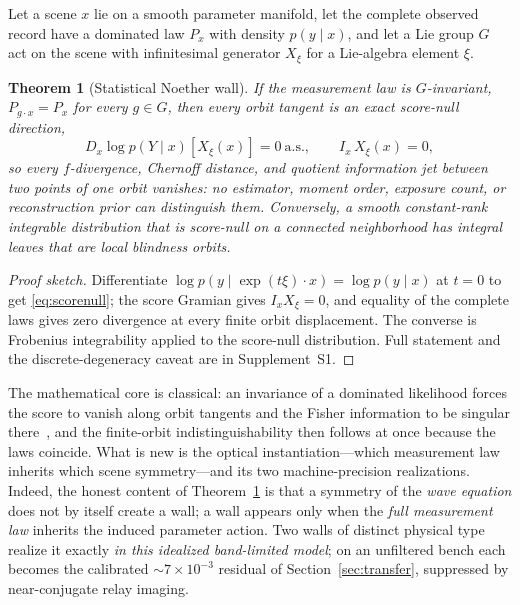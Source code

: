 \documentclass[10pt,twocolumn]{article}
\theoremstyle{plain}
\newtheorem{theorem}{Theorem}
\theoremstyle{definition}
\begin{document}
Let a scene $x$ lie on a smooth parameter manifold, let the complete observed
record have a dominated law $P_x$ with density $p(y\mid x)$, and let a Lie group
$G$ act on the scene with infinitesimal generator $X_\xi$ for a Lie-algebra
element $\xi$.

\begin{theorem}[Statistical Noether wall]\label{thm:noether}
If the measurement law is $G$-invariant, $P_{g\cdot x}=P_x$ for every $g\in G$,
then every orbit tangent is an exact score-null direction,
\begin{equation}
D_x\log p(Y\mid x)[X_\xi(x)]=0\ \text{a.s.},\qquad I_x\,X_\xi(x)=0,
\label{eq:scorenull}
\end{equation}
so every $f$-divergence, Chernoff distance, and quotient information jet between two
points of one orbit vanishes: no estimator, moment order, exposure count, or
reconstruction prior can distinguish them. Conversely, a smooth constant-rank
integrable distribution that is score-null on a connected neighborhood has integral
leaves that are local blindness orbits.
\end{theorem}

\begin{proof}[Proof sketch]
Differentiate $\log p(y\mid \exp(t\xi)\cdot x)=\log p(y\mid x)$ at $t=0$ to get
\eqref{eq:scorenull}; the score Gramian gives $I_xX_\xi=0$, and equality of the
complete laws gives zero divergence at every finite orbit displacement. The
converse is Frobenius integrability applied to the score-null distribution. Full
statement and the discrete-degeneracy caveat are in Supplement~S1.
\end{proof}

The mathematical core is classical: an invariance of a dominated likelihood forces
the score to vanish along orbit tangents and the Fisher information to be singular
there~\cite{Vaart}, and the finite-orbit indistinguishability then follows at once
because the laws coincide. What is new is the optical instantiation---which
measurement law inherits which scene symmetry---and its two machine-precision
realizations. Indeed, the honest content of Theorem~\ref{thm:noether} is that a
symmetry of the \emph{wave equation} does not by itself create a wall; a wall appears
only when the \emph{full measurement law} inherits the induced parameter action. Two
walls of distinct physical type realize it exactly \emph{in this idealized
band-limited model}; on an unfiltered bench each becomes the calibrated
$\sim\!7\times10^{-3}$ residual of Section~\ref{sec:transfer}, suppressed by
near-conjugate relay imaging.
\end{document}
